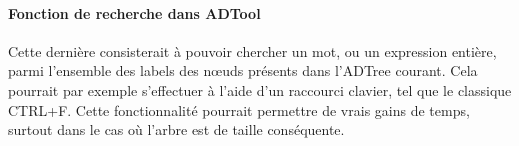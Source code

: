 \paragraph{Fonction de recherche dans ADTool} Cette dernière consisterait à pouvoir chercher un mot, ou un expression entière, parmi l'ensemble des labels des n\oe{}uds présents dans l'ADTree courant. Cela pourrait par exemple s'effectuer à l'aide d'un raccourci clavier, tel que le classique {\sc CTRL+F}. Cette fonctionnalité pourrait permettre de vrais gains de temps, surtout dans le cas où l'arbre est de taille conséquente.